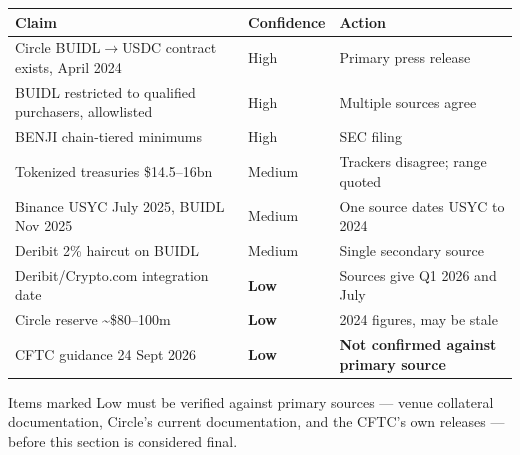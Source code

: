 \documentclass[11pt,a4paper]{article}
\newcommand{\note}[1]{{\small\color{muted}#1}}
\begin{document}
\begin{center}
\small
\begin{tabular}{@{}p{7.0cm}lp{4.3cm}@{}}
\toprule
\textbf{Claim} & \textbf{Confidence} & \textbf{Action} \\
\midrule
Circle BUIDL\(\rightarrow\)USDC contract exists, April 2024 & High & Primary press release \cite{circle} \\
BUIDL restricted to qualified purchasers, allowlisted & High & Multiple sources agree \\
BENJI chain-tiered minimums & High & SEC filing \cite{franklin} \\
Tokenized treasuries \$14.5--16bn & Medium & Trackers disagree; range quoted \\
Binance USYC July 2025, BUIDL Nov 2025 & Medium & One source dates USYC to 2024 \\
Deribit 2\% haircut on BUIDL & Medium & Single secondary source \\
Deribit/Crypto.com integration date & \textbf{Low} & Sources give Q1 2026 and July \\
Circle reserve \textasciitilde\$80--100m & \textbf{Low} & 2024 figures, may be stale \\
CFTC guidance 24 Sept 2026 & \textbf{Low} & \textbf{Not confirmed against primary source} \\
\bottomrule
\end{tabular}
\end{center}

\note{Items marked Low must be verified against primary sources — venue collateral documentation,
Circle's current documentation, and the CFTC's own releases — before this section is considered
final.}
\end{document}

